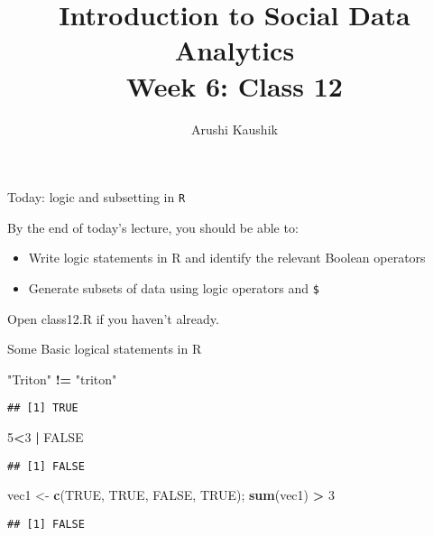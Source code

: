 \documentclass[ignorenonframetext,]{beamer}
\title[Class 12]{Introduction to Social Data Analytics\\
	Week 6: Class 12}
\author[Kaushik]{Arushi Kaushik}
\institute[UCSD]{arkaushi@ucsd.edu}
\date[Week 6]{}
\newenvironment{Shaded}{\begin{snugshade}}{\end{snugshade}}
\newcommand{\KeywordTok}[1]{\textcolor[rgb]{0.13,0.29,0.53}{\textbf{#1}}}
\newcommand{\DecValTok}[1]{\textcolor[rgb]{0.00,0.00,0.81}{#1}}
\newcommand{\StringTok}[1]{\textcolor[rgb]{0.31,0.60,0.02}{#1}}
\newcommand{\OtherTok}[1]{\textcolor[rgb]{0.56,0.35,0.01}{#1}}
\newcommand{\OperatorTok}[1]{\textcolor[rgb]{0.81,0.36,0.00}{\textbf{#1}}}
\newcommand{\NormalTok}[1]{#1}
\providecommand{\tightlist}{%
	\setlength{\itemsep}{0pt}\setlength{\parskip}{0pt}}
\begin{document}
\frame{\titlepage}

\begin{frame}{Today: logic and subsetting in \texttt{R}}

By the end of today's lecture, you should be able to:

\begin{itemize}
\tightlist
\item
  Write logic statements in R and identify the relevant Boolean
  operators
\item
  Generate subsets of data using logic operators and \texttt{\$}
\end{itemize}

Open class12.R if you haven't already.

\end{frame}

\begin{frame}[fragile]{Some Basic logical statements in R}

\begin{Shaded}
\begin{Highlighting}[]
\StringTok{"Triton"} \OperatorTok{!=}\StringTok{ "triton"}
\end{Highlighting}
\end{Shaded}

\begin{verbatim}
## [1] TRUE
\end{verbatim}

\begin{Shaded}
\begin{Highlighting}[]
\DecValTok{5}\OperatorTok{<}\DecValTok{3} \OperatorTok{|}\StringTok{ }\OtherTok{FALSE}
\end{Highlighting}
\end{Shaded}

\begin{verbatim}
## [1] FALSE
\end{verbatim}

\begin{Shaded}
\begin{Highlighting}[]
\NormalTok{vec1 <-}\StringTok{ }\KeywordTok{c}\NormalTok{(}\OtherTok{TRUE}\NormalTok{, }\OtherTok{TRUE}\NormalTok{, }\OtherTok{FALSE}\NormalTok{, }\OtherTok{TRUE}\NormalTok{); }\KeywordTok{sum}\NormalTok{(vec1) }\OperatorTok{>}\StringTok{ }\DecValTok{3}
\end{Highlighting}
\end{Shaded}

\begin{verbatim}
## [1] FALSE
\end{verbatim}

\end{frame}
\end{document}
